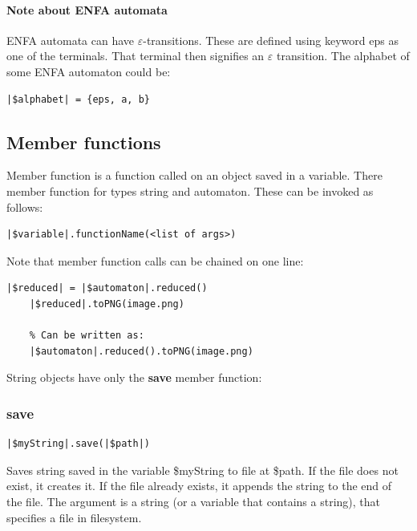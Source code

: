 \documentclass{ctuthesis}
\begin{document}
\paragraph{Note about ENFA automata}
ENFA automata can have $\varepsilon$-transitions. These are defined using keyword eps as one of the terminals. That terminal then signifies an $\varepsilon$ transition. The alphabet of some ENFA automaton could be:
\begin{lstlisting}[language = JASL]
	|$alphabet| = {eps, a, b}
\end{lstlisting} 

\subsection{Member functions}
\label{subsec:member-functions}
Member function is a function called on an object saved in a variable. There member function for types string and automaton. These can be invoked as follows:

\begin{minipage}{\linewidth}
\begin{lstlisting}[language = JASL_snippet]
	|$variable|.functionName(<list of args>)
\end{lstlisting}
\end{minipage} 

Note that member function calls can be chained on one line:

\begin{minipage}{\linewidth}
\begin{lstlisting}[language = JASL]
	|$reduced| = |$automaton|.reduced()
	|$reduced|.toPNG(image.png)
	
	% Can be written as:
	|$automaton|.reduced().toPNG(image.png)
\end{lstlisting}
\end{minipage}

String objects have only the \textbf{save} member function:

\subsubsection{save}
\begin{lstlisting}[language = JASL_snippet]
	|$myString|.save(|$path|)
\end{lstlisting}

Saves string saved in the variable \$myString to file at \$path. If the file does not exist, it creates it. If the file already exists, it appends the string to the end of the file. The argument is a string (or a variable that contains a string), that specifies a file in filesystem.
\end{document}
